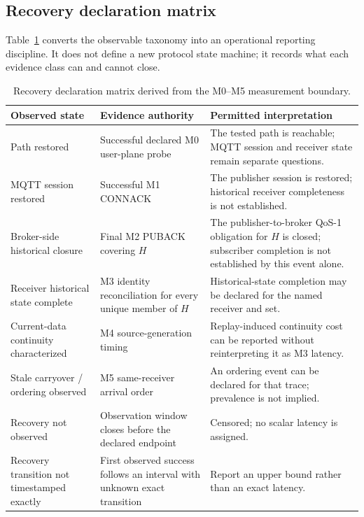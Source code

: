 \documentclass[journal]{IEEEtran}
\begin{document}
\subsection{Recovery declaration matrix}

Table~\ref{tab:declaration} converts the observable taxonomy into an operational reporting discipline. It does not define a new protocol state machine; it records what each evidence class can and cannot close.

\begin{table}[t]
\centering
\caption{Recovery declaration matrix derived from the M0--M5 measurement boundary.}
\label{tab:declaration}
\begin{tabular}{p{}p{}p{}}
\toprule
\textbf{Observed state} & \textbf{Evidence authority} & \textbf{Permitted interpretation} \\
\midrule
Path restored & Successful declared M0 user-plane probe & The tested path is reachable; MQTT session and receiver state remain separate questions. \\
MQTT session restored & Successful M1 CONNACK & The publisher session is restored; historical receiver completeness is not established. \\
Broker-side historical closure & Final M2 PUBACK covering $H$ & The publisher-to-broker QoS-1 obligation for $H$ is closed; subscriber completion is not established by this event alone. \\
Receiver historical state complete & M3 identity reconciliation for every unique member of $H$ & Historical-state completion may be declared for the named receiver and set. \\
Current-data continuity characterized & M4 source-generation timing & Replay-induced continuity cost can be reported without reinterpreting it as M3 latency. \\
Stale carryover / ordering observed & M5 same-receiver arrival order & An ordering event can be declared for that trace; prevalence is not implied. \\
Recovery not observed & Observation window closes before the declared endpoint & Censored; no scalar latency is assigned. \\
Recovery transition not timestamped exactly & First observed success follows an interval with unknown exact transition & Report an upper bound rather than an exact latency. \\
\bottomrule
\end{tabular}
\end{table}
\end{document}
